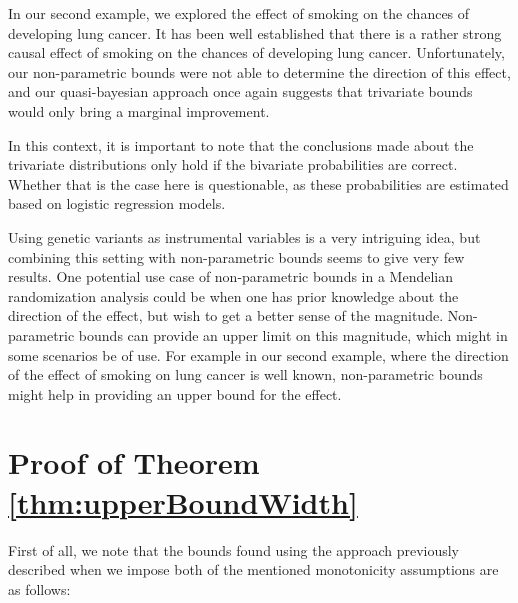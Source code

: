 \documentclass[
]{article}
\theoremstyle{plain}
\begin{document}
{In our second example, we explored the effect of smoking on the chances of developing lung cancer. It has been well established that there is a rather strong causal effect of smoking on the chances of developing lung cancer. Unfortunately, our non-parametric bounds were not able to determine the direction of this effect, and our quasi-bayesian approach once again suggests that trivariate bounds would only bring a marginal improvement.

In this context, it is important to note that the conclusions made about the trivariate distributions only hold if the bivariate probabilities are correct. Whether that is the case here is questionable, as these probabilities are estimated based on logistic regression models.

Using genetic variants as instrumental variables is a very intriguing idea, but combining this setting with non-parametric bounds seems to give very few results. One potential use case of non-parametric bounds in a Mendelian randomization analysis could be when one has prior knowledge about the direction of the effect, but wish to get a better sense of the magnitude. Non-parametric bounds can provide an upper limit on this magnitude, which might in some scenarios be of use. For example in our second example, where the direction of the effect of smoking on lung cancer is well known, non-parametric bounds might help in providing an upper bound for the effect.

\newpage

\hypertarget{appendix-appendix}{%
\appendix}


\hypertarget{proof-of-theorem}{%
\section{\texorpdfstring{Proof of Theorem \ref{thm:upperBoundWidth}}{Proof of Theorem }}\label{proof-of-theorem}}

First of all, we note that the bounds found using the approach previously described when we impose both of the mentioned monotonicity assumptions are as follows:

}
\end{document}
